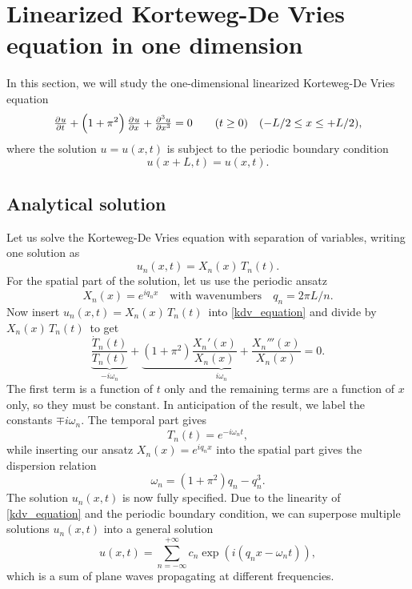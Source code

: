 \section{Linearized Korteweg-De Vries equation in one dimension}

In this section, we will study the one-dimensional linearized Korteweg-De Vries equation
\begin{equation}
\pd{u}{t} + \left(1+\pi^2\right)\pd{u}{x} + \pd[3]{u}{x} = 0 \qquad (t \geq 0) \quad (-L/2 \leq x \leq +L/2),
\label{kdv_equation}
\end{equation}
where the solution $u = u(x,t)$ is subject to the periodic boundary condition
\begin{equation*}
u(x+L, t) = u(x, t).
\end{equation*}

\subsection{Analytical solution}

Let us solve the Korteweg-De Vries equation with separation of variables, writing one solution as
\begin{equation*}
	u_n(x,t) = X_n(x) \, T_n(t).
\end{equation*}
For the spatial part of the solution, let us use the periodic ansatz
\begin{equation*}
	X_n(x) = e^{i q_n x} \quad \text{with wavenumbers} \quad q_n = 2 \pi L / n.
\end{equation*}
Now insert $u_n(x,t) = X_n(x) \, T_n(t)$ into \cref{kdv_equation} and divide by $X_n(x) \, T_n(t)$ to get
\begin{equation*}
	\underbrace{\frac{\dot{T}_n(t)}{T_n(t)}}_{-i \omega_n} + \underbrace{\left( 1 + \pi^2 \right) \frac{X_n'(x)}{X_n(x)} + \frac{X_n'''(x)}{X_n(x)}}_{i \omega_n} = 0.
\end{equation*}
The first term is a function of $t$ only and the remaining terms are a function of $x$ only, so they must be constant.
In anticipation of the result, we label the constants $\mp i \omega_n$.
The temporal part gives
\begin{equation*}
	T_n(t) = e^{-i \omega_n t},
\end{equation*}
while inserting our ansatz $X_n(x) = e^{i q_n x}$ into the spatial part gives the dispersion relation
\begin{equation*}
	\omega_n = (1 + \pi^2) q_n - q_n^3.
\end{equation*}
The solution $u_n(x,t)$ is now fully specified.
Due to the linearity of \cref{kdv_equation} and the periodic boundary condition, we can superpose multiple solutions $u_n(x,t)$ into a general solution
\begin{equation}
	u(x,t) = \sum_{n=-\infty}^{+\infty} c_n \exp{\left( i(q_n x - \omega_n t) \right)},
\end{equation}
which is a sum of plane waves propagating at different frequencies.

